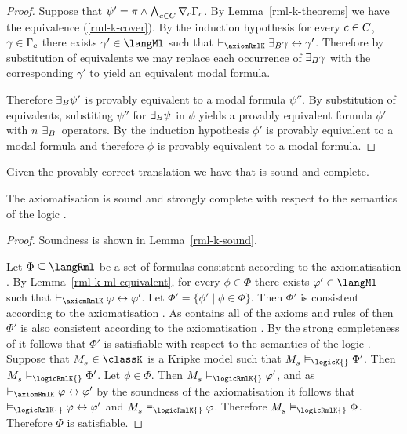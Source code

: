 \begin{proof}
Suppose that $\psi' = \pi \land \bigwedge_{c \in C} \nabla_{c} \Gamma_c$.
By Lemma~\ref{rml-k-theorems} we have the equivalence (\ref{rml-k-cover}).
By the induction hypothesis for every $c \in C$, $\gamma \in \Gamma_c$ there exists $\gamma' \in \langMl$ such that $\proves_\axiomRmlK \somerefsBs \gamma \iff \gamma'$.
Therefore by substitution of equivalents we may replace each occurrence of ${\exists_{B}} \gamma$ with the corresponding $\gamma'$ to yield an equivalent modal formula. 

Therefore ${\exists_{B}} \psi'$ is provably equivalent to a modal formula $\psi''$.
By substitution of equivalents, substiting $\psi''$ for ${\exists_{B}} \psi$ in $\phi$ yields a provably equivalent formula $\phi'$ with $n$ ${\exists_{B}}$~operators.
By the induction hypothesis $\phi'$ is provably equivalent to a modal formula and therefore $\phi$ is provably equivalent to a modal formula.
\end{proof}

Given the provably correct translation we have that \axiomRmlK{} is sound and complete.

\begin{theorem}\label{rml-k-sound-complete}
The axiomatisation \axiomRmlK{} is sound and strongly complete with respect to the semantics of the logic \logicRmlK{}.
\end{theorem}

\begin{proof}
Soundness is shown in Lemma~\ref{rml-k-sound}.

Let $\Phi \subseteq \langRml$ be a set of formulas consistent according to the axiomatisation \axiomRmlK{}.
By Lemma~\ref{rml-k-ml-equivalent}, for every $\phi \in \Phi$ there exists $\phi' \in \langMl$ such that $\proves_\axiomRmlK \phi \iff \phi'$.
Let $\Phi' = \{\phi' \mid \phi \in \Phi\}$.
Then $\Phi'$ is consistent according to the axiomatisation \axiomRmlK{}.
As \axiomRmlK{} contains all of the axioms and rules of \axiomK{} then $\Phi'$ is also consistent according to the axiomatisation \axiomK{}.
By the strong completeness of \axiomK{} it follows that $\Phi'$ is satisfiable with respect to the semantics of the logic \logicK{}.
Suppose that $\kPModel{\kStateS} \in \classK$ is a Kripke model such that $\kPModel{\kStateS} \entails_\logicK{} \Phi'$.
Then $\kPModel{\kStateS} \entails_\logicRmlK{} \Phi'$.
Let $\phi \in \Phi$.
Then $\kPModel{\kStateS} \entails_\logicRmlK{} \phi'$, and as $\proves_\axiomRmlK \phi \iff \phi'$ by the soundness of the axiomatisation \axiomRmlK{} it follows that $\entails_\logicRmlK{} \phi \iff \phi'$ and $\kPModel{\kStateS} \entails_\logicRmlK{} \phi$.
Therefore $\kPModel{\kStateS} \entails_\logicRmlK{} \Phi$.
Therefore $\Phi$ is satisfiable.
\end{proof}

